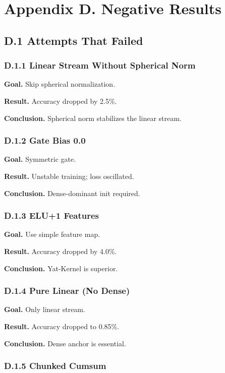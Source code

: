 \section{Appendix D. Negative Results}

\subsection{D.1 Attempts That Failed}

\subsubsection{D.1.1 Linear Stream Without Spherical Norm}

\textbf{Goal.} Skip spherical normalization.

\textbf{Result.} Accuracy dropped by 2.5\%.

\textbf{Conclusion.} Spherical norm stabilizes the linear stream.

\subsubsection{D.1.2 Gate Bias 0.0}

\textbf{Goal.} Symmetric gate.

\textbf{Result.} Unstable training; loss oscillated.

\textbf{Conclusion.} Dense-dominant init required.

\subsubsection{D.1.3 ELU+1 Features}

\textbf{Goal.} Use simple feature map.

\textbf{Result.} Accuracy dropped by 4.0\%.

\textbf{Conclusion.} Yat-Kernel is superior.

\subsubsection{D.1.4 Pure Linear (No Dense)}

\textbf{Goal.} Only linear stream.

\textbf{Result.} Accuracy dropped to 0.85\%.

\textbf{Conclusion.} Dense anchor is essential.

\subsubsection{D.1.5 Chunked Cumsum}

